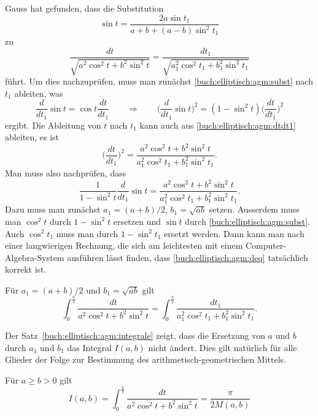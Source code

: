 Gauss hat gefunden, dass die Substitution
\begin{equation}
\sin t
=
\frac{2a\sin t_1}{a+b+(a-b)\sin^2 t_1}
\label{buch:elliptisch:agm:subst}
\end{equation}
zu
\begin{equation}
\frac{dt}{\sqrt{a^2_{\phantom{1}}\cos^2 t + b^2_{\phantom{1}} \sin^2 t}}
=
\frac{dt_1}{\sqrt{a_1^2\cos^2 t_1 + b_1^2 \sin^2 t_1}}
\label{buch:elliptisch:agm:dtdt1}
\end{equation}
führt.
Um dies nachzuprüfen, muss man zunächst
\eqref{buch:elliptisch:agm:subst}
nach $t_1$ ableiten, was
\[
\frac{d}{dt_1}\sin t
=
\cos t
\frac{dt}{dt_1}
\qquad\Rightarrow\qquad
\biggl(
\frac{d}{dt_1}\sin t
\biggr)^2
=
(1-\sin^2t)\biggl(\frac{dt}{dt_1}\biggr)^2
\]
ergibt.
Die Ableitung von $t$ nach $t_1$ kann auch aus
\eqref{buch:elliptisch:agm:dtdt1}
ableiten, es ist
\[
\biggl(
\frac{dt}{dt_1}
\biggr)^2
=
\frac{a^2_{\phantom{1}} \cos^2 t + b^2_{\phantom{1}} \sin^2 t}{a_1^2 \cos^2 t_1 + b_1^2 \sin^2 t_1}.
\]
Man muss also nachprüfen, dass
\begin{equation}
\frac{1}{1-\sin^2 t}
\frac{d}{dt_1}\sin t
=
\frac{a^2 \cos^2 t + b^2 \sin^2 t}{a_1^2 \cos^2 t_1 + b_1^2 \sin^2 t_1}.
\label{buch:elliptisch:agm:deq}
\end{equation}
Dazu muss man zunächst $a_1=(a+b)/2$, $b_1=\!\sqrt{ab}$ setzen.
Ausserdem muss man $\cos^2 t$ durch $1-\sin^2t$ ersetzen und
$\sin t$ durch \eqref{buch:elliptisch:agm:subst}.
Auch $\cos^2 t_1$ muss man durch $1-\sin^2t_1$ ersetzt werden.
Dann kann man nach einer langwierigen Rechnung, die sich am leichtesten
mit einem Computer-Algebra-System ausführen lässt finden, dass
\eqref{buch:elliptisch:agm:deq}
tatsächlich korrekt ist.

\begin{satz}
\label{buch:elliptisch:agm:integrale}
Für $a_1=(a+b)/2$ und $b_1=\sqrt{ab}$ gilt
\[
\int_0^{\frac{\pi}2}
\frac{dt}{a^2\cos^2 t + b^2 \sin^2 t}
=
\int_0^{\frac{\pi}2}
\frac{dt_1}{a_1^2\cos^2 t_1 + b_1^2 \sin^2 t_1}.
\]
\end{satz}

Der Satz~\ref{buch:elliptisch:agm:integrale} zeigt, dass die Ersetzung
von $a$ und $b$ durch $a_1$ und $b_1$ das Integral $I(a,b)$ nicht ändert.
Dies gilt natürlich für alle Glieder der Folge zur Bestimmung des
arithmetisch-geometrischen Mittels.

\begin{satz}
Für $a\ge b>0$ gilt
\begin{equation}
I(a,b)
=
\int_0^{\frac{\pi}2}
\frac{dt}{a^2\cos^2 t + b^2\sin^2t}
=
\frac{\pi}{2M(a,b)}
\end{equation}
\end{satz}

